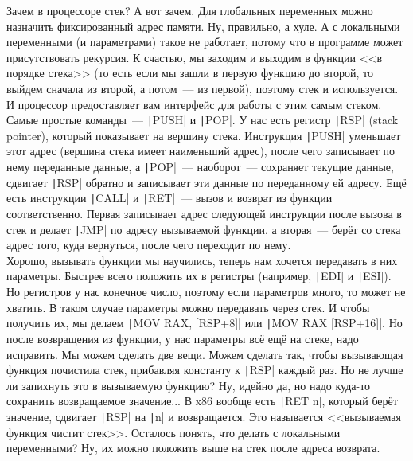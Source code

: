 \documentclass{article}
\begin{document}
    Зачем в процессоре стек? А вот зачем. Для глобальных переменных можно назначить фиксированный адрес памяти. Ну, правильно, а хуле. А с локальными переменными (и параметрами) такое не работает, потому что в программе может присутствовать рекурсия. К счастью, мы заходим и выходим в функции <<в порядке стека>> (то есть если мы зашли в первую функцию до второй, то выйдем сначала из второй, а потом~--- из первой), поэтому стек и используется. И процессор предоставляет вам интерфейс для работы с этим самым стеком. Самые простые команды~--- \texttt|PUSH| и \texttt|POP|. У нас есть регистр \texttt|RSP| (stack pointer), который показывает на вершину стека. Инструкция \texttt|PUSH| уменьшает этот адрес (вершина стека имеет наименьший адрес), после чего записывает по нему переданные данные, а \texttt|POP|~--- наоборот~--- сохраняет текущие данные, сдвигает \texttt|RSP| обратно и записывает эти данные по переданному ей адресу. Ещё есть инструкции \texttt|CALL| и \texttt|RET|~--- вызов и возврат из функции соответственно. Первая записывает адрес следующей инструкции после вызова в стек и делает \texttt|JMP| по адресу вызываемой функции, а вторая~--- берёт со стека адрес того, куда вернуться, после чего переходит по нему.\\
    Хорошо, вызывать функции мы научились, теперь нам хочется передавать в них параметры. Быстрее всего положить их в регистры (например, \texttt|EDI| и \texttt|ESI|). Но регистров у нас конечное число, поэтому если параметров много, то может не хватить. В таком случае параметры можно передавать через стек. И чтобы получить их, мы делаем \texttt|MOV RAX, [RSP+8]| или \texttt|MOV RAX [RSP+16]|. Но после возвращения из функции, у нас параметры всё ещё на стеке, надо исправить. Мы можем сделать две вещи. Можем сделать так, чтобы вызывающая функция почистила стек, прибавляя константу к \texttt|RSP| каждый раз. Но не лучше ли запихнуть это в вызываемую функцию? Ну, идейно да, но надо куда-то сохранить возвращаемое значение... В x86 вообще есть \texttt|RET n|, который берёт значение, сдвигает \texttt|RSP| на \texttt|n| и возвращается. Это называется <<вызываемая функция чистит стек>>. Осталось понять, что делать с локальными переменными? Ну, их можно положить выше на стек после адреса возврата.\\
\end{document}

